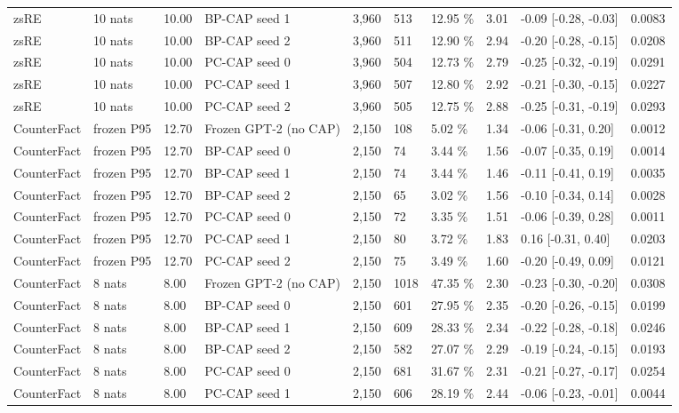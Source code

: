 \documentclass[10pt,a4paper]{article}
\begin{document}
\begin{center}
\begin{tabularx}{\textwidth}{@{}p{}XXXXXXXXX@{}}
zsRE & 10 nats & 10.00 & BP-CAP seed 1 & 3,960 & 513 & 12.95 \% & 3.01 & -0.09 [-0.28, -0.03] & 0.0083 \\
zsRE & 10 nats & 10.00 & BP-CAP seed 2 & 3,960 & 511 & 12.90 \% & 2.94 & -0.20 [-0.28, -0.15] & 0.0208 \\
zsRE & 10 nats & 10.00 & PC-CAP seed 0 & 3,960 & 504 & 12.73 \% & 2.79 & -0.25 [-0.32, -0.19] & 0.0291 \\
zsRE & 10 nats & 10.00 & PC-CAP seed 1 & 3,960 & 507 & 12.80 \% & 2.92 & -0.21 [-0.30, -0.15] & 0.0227 \\
zsRE & 10 nats & 10.00 & PC-CAP seed 2 & 3,960 & 505 & 12.75 \% & 2.88 & -0.25 [-0.31, -0.19] & 0.0293 \\
CounterFact & frozen P95 & 12.70 & Frozen GPT-2 (no CAP) & 2,150 & 108 & 5.02 \% & 1.34 & -0.06 [-0.31, 0.20] & 0.0012 \\
CounterFact & frozen P95 & 12.70 & BP-CAP seed 0 & 2,150 & 74 & 3.44 \% & 1.56 & -0.07 [-0.35, 0.19] & 0.0014 \\
CounterFact & frozen P95 & 12.70 & BP-CAP seed 1 & 2,150 & 74 & 3.44 \% & 1.46 & -0.11 [-0.41, 0.19] & 0.0035 \\
CounterFact & frozen P95 & 12.70 & BP-CAP seed 2 & 2,150 & 65 & 3.02 \% & 1.56 & -0.10 [-0.34, 0.14] & 0.0028 \\
CounterFact & frozen P95 & 12.70 & PC-CAP seed 0 & 2,150 & 72 & 3.35 \% & 1.51 & -0.06 [-0.39, 0.28] & 0.0011 \\
CounterFact & frozen P95 & 12.70 & PC-CAP seed 1 & 2,150 & 80 & 3.72 \% & 1.83 & 0.16 [-0.31, 0.40] & 0.0203 \\
CounterFact & frozen P95 & 12.70 & PC-CAP seed 2 & 2,150 & 75 & 3.49 \% & 1.60 & -0.20 [-0.49, 0.09] & 0.0121 \\
CounterFact & 8 nats & 8.00 & Frozen GPT-2 (no CAP) & 2,150 & 1018 & 47.35 \% & 2.30 & -0.23 [-0.30, -0.20] & 0.0308 \\
CounterFact & 8 nats & 8.00 & BP-CAP seed 0 & 2,150 & 601 & 27.95 \% & 2.35 & -0.20 [-0.26, -0.15] & 0.0199 \\
CounterFact & 8 nats & 8.00 & BP-CAP seed 1 & 2,150 & 609 & 28.33 \% & 2.34 & -0.22 [-0.28, -0.18] & 0.0246 \\
CounterFact & 8 nats & 8.00 & BP-CAP seed 2 & 2,150 & 582 & 27.07 \% & 2.29 & -0.19 [-0.24, -0.15] & 0.0193 \\
CounterFact & 8 nats & 8.00 & PC-CAP seed 0 & 2,150 & 681 & 31.67 \% & 2.31 & -0.21 [-0.27, -0.17] & 0.0254 \\
CounterFact & 8 nats & 8.00 & PC-CAP seed 1 & 2,150 & 606 & 28.19 \% & 2.44 & -0.06 [-0.23, -0.01] & 0.0044 \\

\end{tabularx}
\end{center}
\end{document}
